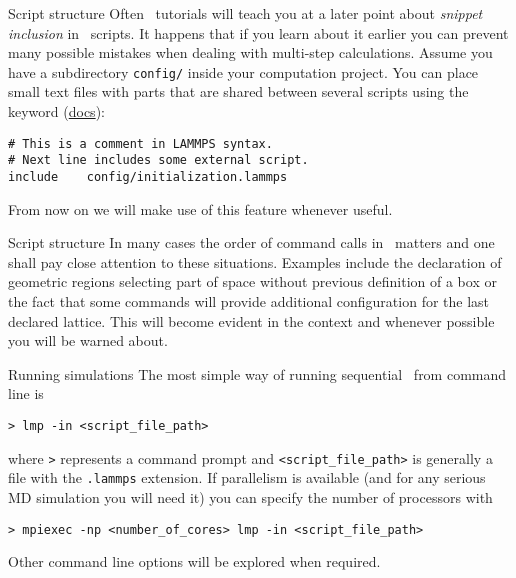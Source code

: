 \begin{frame}[fragile]{\secname}{Script structure}
Often \LAMMPS\ tutorials will teach you at a later point about \emph{snippet inclusion} in \LAMMPS\ scripts. It happens that if you learn about it earlier you can prevent many possible mistakes when dealing with multi-step calculations. Assume you have a subdirectory \Verb|config/| inside your computation project. You can place small text files with parts that are shared between several scripts using the keyword  (\href{https://docs.lammps.org/include.html}{docs}):

\vspace{1cm}

\begin{lstlisting}[language={LAMMPS}]
# This is a comment in LAMMPS syntax.
# Next line includes some external script.
include    config/initialization.lammps
\end{lstlisting}

\vspace{1cm}

From now on we will make use of this feature whenever useful.
\end{frame}

\begin{frame}{\secname}{Script structure}
In many cases the order of command calls in \LAMMPS\ matters and one shall pay close attention to these situations. Examples include the declaration of geometric regions selecting part of space without previous definition of a box or the fact that some commands will provide additional configuration for the last declared lattice. This will become evident in the context and whenever possible you will be warned about.
\end{frame}

\begin{frame}[fragile]{\secname}{Running simulations}
The most simple way of running sequential \LAMMPS\ from command line is

\begin{verbatim}
> lmp -in <script_file_path>
\end{verbatim}

\noindent{}where \Verb|>| represents a command prompt and \Verb|<script_file_path>| is generally a file with the \Verb|.lammps| extension. If parallelism is available (and for any serious MD simulation you will need it) you can specify the number of processors with

\begin{verbatim}
> mpiexec -np <number_of_cores> lmp -in <script_file_path>
\end{verbatim}

Other command line options will be explored when required.
\end{frame}
\endinput
